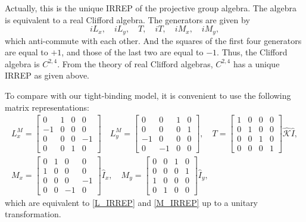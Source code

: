 \documentclass[aps,prl,twocolumn,noshowpacs,superscriptaddress]{revtex4-1}
\def \K {\hat{\mathcal{K}}}
\begin{document}
Actually, this is the unique IRREP of the projective group algebra. The algebra is equivalent to a real Clifford algebra. The generators are given by
\begin{equation}
	iL_{x},\quad  iL_{y},\quad T,\quad  iT,\quad iM_{x},\quad iM_{y},
\end{equation}
which anti-commute with each other. And the squares of the first four generators are equal to $+1$, and those of the last two are equal to $-1$. Thus, the Clifford algebra is $C^{2,4}$. From the theory of real Clifford algebras, $C^{2,4}$  has a unique IRREP as given above.

To compare with our tight-binding model, it is convenient to use the following matrix representations:
\begin{gather}\label{L_IRREP_2}
	L_x^M=\begin{bmatrix}
		0 & 1 & 0 & 0\\
		-1 & 0 & 0 & 0\\
		0 & 0 & 0 & -1\\
		0 & 0 & 1 & 0
	\end{bmatrix}\quad 
	L_y^M=\begin{bmatrix}
		0 & 0 & 1 & 0\\
		0 & 0 & 0 & 1\\
		-1 & 0 & 0 & 0\\
		0 & -1 & 0 & 0
	\end{bmatrix},\quad T=\begin{bmatrix}
		1 & 0 & 0 & 0\\
		0 & 1 & 0 & 0\\
		0 & 0 & 1 & 0\\
		0 & 0 & 0 & 1
	\end{bmatrix}\K \hat{I},\nonumber \\
	M_x=\begin{bmatrix}
		0 & 1 & 0 & 0\\
		1 & 0 & 0 & 0\\
		0 & 0 & 0 & -1\\
		0 & 0 & -1 & 0
	\end{bmatrix}\hat{I}_x,\quad M_y=\begin{bmatrix}
		0 & 0 & 1 & 0\\
		0 & 0 & 0 & 1\\
		1 & 0 & 0 & 0\\
		0 & 1 & 0 & 0
	\end{bmatrix}\hat{I}_y,
\end{gather}
which are equivalent to \eqref{L_IRREP} and \eqref{M_IRREP} up to a unitary transformation.
\end{document}
